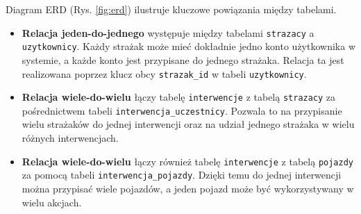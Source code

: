 Diagram ERD (Rys. \ref{fig:erd}) ilustruje kluczowe powiązania między tabelami.
\begin{itemize}
    \item \textbf{Relacja jeden-do-jednego} występuje między tabelami \texttt{strazacy} a \texttt{uzytkownicy}. Każdy strażak może mieć dokładnie jedno konto użytkownika w systemie, a każde konto jest przypisane do jednego strażaka. Relacja ta jest realizowana poprzez klucz obcy \texttt{strazak\_id} w tabeli \texttt{uzytkownicy}.
    \item \textbf{Relacja wiele-do-wielu} łączy tabelę \texttt{interwencje} z tabelą \texttt{strazacy} za pośrednictwem tabeli \texttt{interwencja\_uczestnicy}. Pozwala to na przypisanie wielu strażaków do jednej interwencji oraz na udział jednego strażaka w wielu różnych interwencjach.
    \item \textbf{Relacja wiele-do-wielu} łączy również tabelę \texttt{interwencje} z tabelą \texttt{pojazdy} za pomocą tabeli \texttt{interwencja\_pojazdy}. Dzięki temu do jednej interwencji można przypisać wiele pojazdów, a jeden pojazd może być wykorzystywany w wielu akcjach.
\end{itemize}
